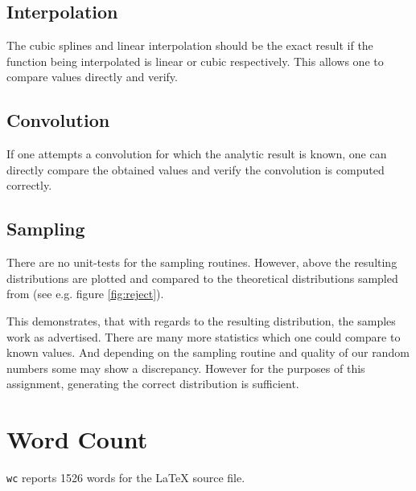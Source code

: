 \documentclass[10pt, a4paper]{article}
\begin{document}
  \subsection{Interpolation}
  The cubic splines and linear interpolation should be the exact result if the function being interpolated
  is linear or cubic respectively. This allows one to compare values directly and verify.

  \subsection{Convolution}
  If one attempts a convolution for which the analytic result is known, one can directly compare the
  obtained values and verify the convolution is computed correctly.

  \subsection{Sampling}
  There are no unit-tests for the sampling routines. However, above the resulting distributions
  are plotted and compared to the theoretical distributions sampled from (see e.g. figure \ref{fig:reject}).

  This demonstrates, that with regards to the resulting distribution, the samples work as advertised.
  There are many more statistics which one could compare to known values. And depending on the sampling
  routine and quality of our random numbers some may show a discrepancy. However for the purposes of
  this assignment, generating the correct distribution is sufficient\footnotemark{}.


\section{Word Count}
\texttt{wc} reports 1526 words for the \LaTeX{} source file.
\end{document}
